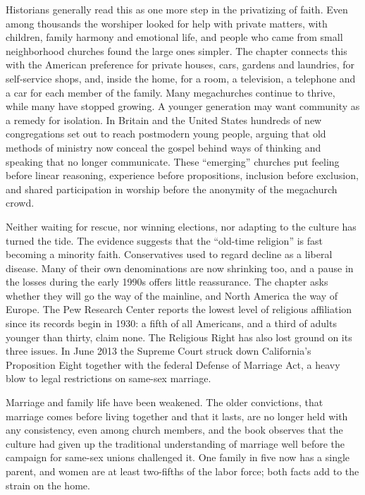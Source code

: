 Historians generally read this as one more step in the privatizing of faith. Even among thousands the
worshiper looked for help with private matters, with children, family harmony and emotional life,
and people who came from small neighborhood churches found the large ones simpler. The chapter
connects this with the American preference for private houses, cars, gardens and laundries, for
self-service shops, and, inside the home, for a room, a television, a telephone and a car for each
member of the family. Many megachurches continue to thrive, while many have stopped growing. A
younger generation may want community as a remedy for isolation. In Britain and the United States
hundreds of new congregations set out to reach postmodern young people, arguing that old methods of
ministry now conceal the gospel behind ways of thinking and speaking that no longer communicate.
These ``emerging'' churches put feeling before linear reasoning, experience before propositions,
inclusion before exclusion, and shared participation in worship before the anonymity of the
megachurch crowd.

Neither waiting for rescue, nor winning elections, nor adapting to the culture has turned the tide.
The evidence suggests that the ``old-time religion'' is fast becoming a minority faith. Conservatives
used to regard decline as a liberal disease. Many of their own denominations are now shrinking too,
and a pause in the losses during the early 1990s offers little reassurance. The chapter asks whether
they will go the way of the mainline, and North America the way of Europe. The Pew Research Center
reports the lowest level of religious affiliation since its records begin in 1930: a fifth of all
Americans, and a third of adults younger than thirty, claim none. The Religious Right has also lost
ground on its three issues. In June 2013 the Supreme Court struck down California's Proposition Eight
together with the federal Defense of Marriage Act, a heavy blow to legal restrictions on same-sex
marriage.

Marriage and family life have been weakened. The older convictions, that marriage comes before
living together and that it lasts, are no longer held with any consistency, even among church
members, and the book observes that the culture had given up the traditional understanding of
marriage well before the campaign for same-sex unions challenged it. One family in five now has a
single parent, and women are at least two-fifths of the labor force; both facts add to the strain on
the home.

